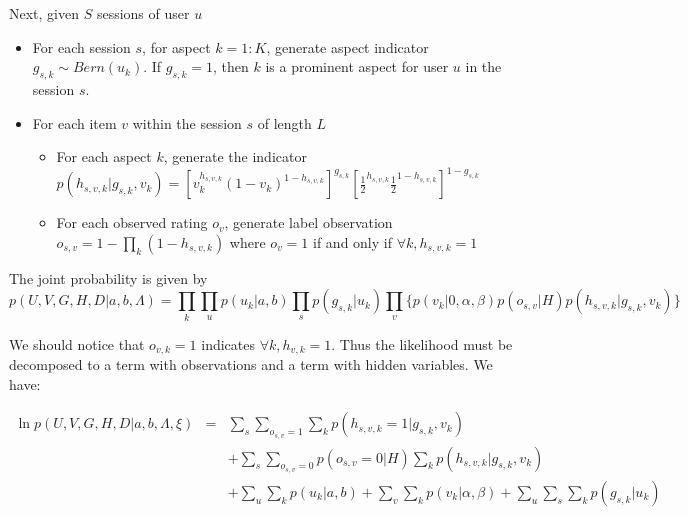 \documentclass[11pt]{report}
\begin{document}
Next, given $S$ sessions of user $u$
\begin{itemize}
\item For each session $s$, for aspect $k=1:K$, generate aspect indicator $g_{s,k} \sim Bern(u_k)$. If $g_{s,k}=1$, then $k$ is a prominent aspect for user $u$ in the session $s$.
\item For each item $v$ within the session $s$ of length $L$
\begin{itemize}
\item For each aspect $k$, generate the indicator $p(h_{s,v,k}|g_{s,k},v_k)=[v_k^{h_{s,v,k}} (1-v_k)^{1-h_{s,v,k}}]^{g_{s,k}} [\frac{1}{2}^{h_{s,v,k}} \frac{1}{2}^{1-h_{s,v,k}}]^{1-g_{s,k}}$
\item For each observed rating $o_v$, generate label observation $o_{s,v}=1-\prod_k (1-h_{s,v,k})$ where $o_v=1$ if and only if $\forall k, h_{s,v,k}=1$
\end{itemize}
\end{itemize}

The joint probability is given by
\begin{equation*}
    p(U,V,G,H,D |a,b,\Lambda) =    \prod_k \prod_u p(u_{k}|a,b)  \prod_{s} p(g_{s,k} | u_k)  \prod_{v} \{ p(v_k|0,\alpha,\beta) p(o_{s,v}|H)  p(h_{s,v,k}|g_{s,k},v_k)\}
    \end{equation*}


We should notice that $o_{v,k}=1$ indicates $\forall k, h_{v,k}=1$. Thus the likelihood must be decomposed to a term with observations and a term with hidden variables. We have:

\begin{eqnarray}\label{equ:completelikelihoodsigmodal}
\ln p(U,V,G,H,D|a,b,\Lambda,\xi)  & = &\sum_s\sum_{o_{s,v}=1} \sum_k p(h_{s,v,k}=1|g_{s,k},v_k) \\\nonumber
& &+\sum_s \sum_{o_{s,v}=0} p(o_{s,v}=0|H) \sum_k p(h_{s,v,k}|g_{s,k},v_k)\\\nonumber
& &+\sum_u\sum_k p(u_{k}|a,b) + \sum_v \sum_k p(v_k|\alpha,\beta) + \sum_u \sum_s \sum_k p(g_{s,k}|u_k) 
\end{eqnarray}
\end{document}
